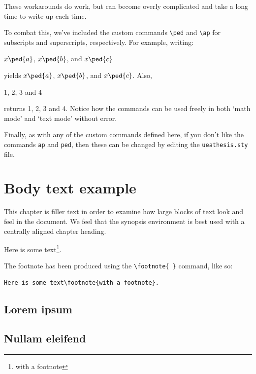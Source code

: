 These workarounds do work, but can become overly complicated and take a long time to write up each time. 

To combat this, we've included the custom commands \verb|\ped| and \verb|\ap| for subscripts and superscripts, respectively. For example, writing:
\begin{spverbatim}
$x\ped{a}$, $x\ped{b}$, and $x\ped{c}$
\end{spverbatim}
yields $x\ped{a}$, $x\ped{b}$, and $x\ped{c}$. Also,
\begin{spverbatim}
1, 2, 3 and 4
\end{spverbatim}
returns 1, 2, 3 and 4. Notice how the commands can be used freely in both ‘math mode’ and ‘text mode’ without error. 

Finally, as with any of the custom commands defined here, if you don't like the commands \verb|ap| and \verb|ped|, then these can be changed by editing the \verb|ueathesis.sty| file. 


\chapter{Body text example}

\begin{synopsis}
\noindent This chapter is filler text in order to examine how large blocks of text look and feel in the document. We feel that the synopsis environment is best used with a centrally aligned chapter heading. 
\end{synopsis}

Here is some text\footnote{with a footnote}.

The footnote has been produced using the \verb|\footnote{ }| command, like so:
\begin{verbatim}
Here is some text\footnote{with a footnote}.

\end{verbatim}

\section{Lorem ipsum}
\lipsum[1-6]
\section{Nullam eleifend}
\lipsum[7-12]